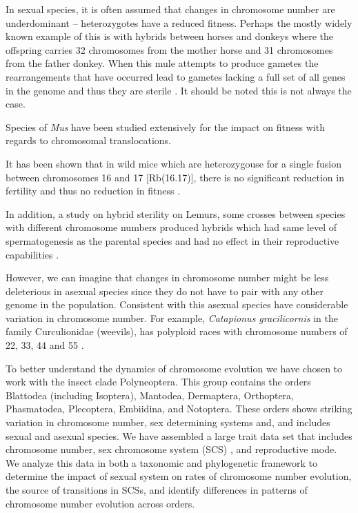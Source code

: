 In sexual species, it is often assumed that changes in chromosome number are underdominant \citep{white1973} -- heterozygotes have a reduced fitness. 
Perhaps the mostly widely known example of this is with hybrids between horses and donkeys where the offspring carries 32 chromosomes from the mother horse and 31 chromosomes from the father donkey. 
When this mule attempts to produce gametes the rearrangements that have occurred lead to gametes lacking a full set of all genes in the genome and thus they are sterile \citep{wodsedalek1916}. 
It should be noted this is not always the case.  %

Species of \textit{Mus} have been studied extensively for the impact on fitness with regards to chromosomal translocations.

It has been shown that in wild mice which are heterozygouse for a single fusion between chromosomes 16 and 17 [Rb(16.17)], there is no significant reduction in fertility and thus no reduction in fitness \citep{britton1990robertsonian}.

In addition, a study on hybrid sterility on Lemurs, some crosses between species with different chromosome numbers produced hybrids which had same level of spermatogenesis as the parental species and had no effect in their reproductive capabilities \citep{king1995}.   

However, we can imagine that changes in chromosome number might be less deleterious in asexual species since they do not have to pair with any other genome in the population.
Consistent with this asexual species have considerable variation in chromosome number. 
For example, \textit{Catapionus gracilicornis} in the family Curculionidae (weevils), has polyploid races with chromosome numbers of 22, 33, 44 and 55 \citep{lachowska1998}. 

To better understand the dynamics of chromosome evolution we have chosen to work with the insect clade Polyneoptera.
This group contains the orders Blattodea (including Isoptera), Mantodea, Dermaptera, Orthoptera, Phasmatodea, Plecoptera, Embiidina, and Notoptera.
These orders shows striking variation in chromosome number, sex determining systems and, and includes sexual and asexual species. 
We have assembled a large trait data set that includes chromosome number, sex chromosome system (SCS) , and reproductive mode.
We analyze this data in both a taxonomic and phylogenetic framework to determine the impact of sexual system on rates of chromosome number evolution, the source of transitions in SCSs, and identify differences in patterns of chromosome number evolution across orders.
 
